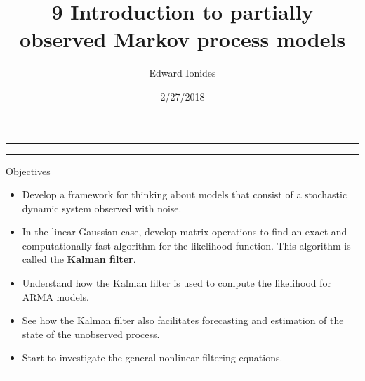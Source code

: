\documentclass[]{article}
\title{9 Introduction to partially observed Markov process models}
\author{Edward Ionides}
\date{2/27/2018}
\begin{document}
\maketitle

{
\setcounter{tocdepth}{2}
\tableofcontents
}
\newcommand\prob{\mathbb{P}}
\newcommand\E{\mathbb{E}}
\newcommand\var{\mathrm{Var}}
\newcommand\cov{\mathrm{Cov}}
\newcommand\loglik{\ell}
\newcommand\R{\mathbb{R}}
\newcommand\data[1]{#1^*}
\newcommand\params{\, ; \,}
\newcommand\transpose{\scriptsize{T}}
\newcommand\eqspace{\quad\quad}
\newcommand\myeq[1]{\eqspace \displaystyle #1}
\newcommand\lik{\mathscr{L}}
\newcommand\profileloglik[1]{\ell^\mathrm{profile}_#1}
\newcommand\ar{\phi}
\newcommand\ma{\psi}
\newcommand\AR{\Phi}
\newcommand\MA{\Psi}
\newcommand\ev{u}
\newcommand\given{{\, | \,}}
\newcommand\equals{{=\,}}
\newcommand\matA{\mathbb{A}}
\newcommand\matB{\mathbb{B}}
\newcommand\matH{\mathbb{H}}
\newcommand\covmatX{\mathbb{U}}
\newcommand\covmatY{\mathbb{V}}





\begin{center}\rule{0.5\linewidth}{\linethickness}\end{center}

\begin{center}\rule{0.5\linewidth}{\linethickness}\end{center}

Objectives

\begin{itemize}
\item
  Develop a framework for thinking about models that consist of a
  stochastic dynamic system observed with noise.
\item
  In the linear Gaussian case, develop matrix operations to find an
  exact and computationally fast algorithm for the likelihood function.
  This algorithm is called the \textbf{Kalman filter}.
\item
  Understand how the Kalman filter is used to compute the likelihood for
  ARMA models.
\item
  See how the Kalman filter also facilitates forecasting and estimation
  of the state of the unobserved process.
\item
  Start to investigate the general nonlinear filtering equations.
\end{itemize}

\begin{center}\rule{0.5\linewidth}{\linethickness}\end{center}
\end{document}
